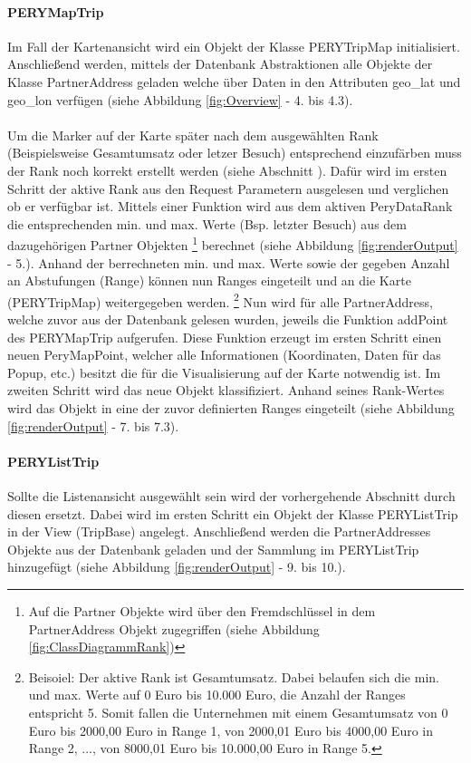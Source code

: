 \documentclass[Bachelorarbeit.tex]{subfiles}
\begin{document}
\paragraph{PERYMapTrip}
\label{PERYMapTrip}
Im Fall der Kartenansicht wird ein Objekt der Klasse PERYTripMap initialisiert. 
Anschließend werden, mittels der Datenbank Abstraktionen alle Objekte der Klasse PartnerAddress geladen welche über Daten in den Attributen geo\_lat und geo\_lon verfügen (siehe Abbildung \ref{fig:Overview} - 4. bis 4.3). \\
\\
Um die Marker auf der Karte später nach dem ausgewählten Rank (Beispielsweise Gesamtumsatz oder letzer Besuch) entsprechend einzufärben muss der Rank noch korrekt erstellt werden (siehe Abschnitt ). 
Dafür wird im ersten Schritt der aktive Rank aus den Request Parametern ausgelesen und verglichen ob er verfügbar ist.
Mittels einer Funktion wird aus dem aktiven PeryDataRank die entsprechenden min. und max. Werte (Bsp. letzter Besuch) aus dem dazugehörigen Partner Objekten
	\footnote{Auf die Partner Objekte wird über den Fremdschlüssel in dem PartnerAddress Objekt zugegriffen (siehe Abbildung \ref{fig:ClassDiagrammRank})}  
berechnet (siehe Abbildung \ref{fig:renderOutput} - 5.).
Anhand der berrechneten min. und max. Werte sowie der gegeben Anzahl an Abstufungen (Range) können nun Ranges eingeteilt und an die Karte (PERYTripMap) weitergegeben werden.
	\footnote{Beisoiel: Der aktive Rank ist Gesamtumsatz. Dabei belaufen sich die min. und max. Werte auf 0 Euro bis 10.000 Euro, die Anzahl der Ranges entspricht 5. Somit fallen die Unternehmen mit einem Gesamtumsatz von 0 Euro bis 2000,00 Euro in Range 1, von 2000,01 Euro bis 4000,00 Euro in Range 2, ..., von 8000,01 Euro bis 10.000,00 Euro in Range 5.} 
Nun wird für alle PartnerAddress, welche zuvor aus der Datenbank gelesen wurden, jeweils die Funktion addPoint des PERYMapTrip  aufgerufen. 
Diese Funktion erzeugt im ersten Schritt einen neuen PeryMapPoint, welcher alle Informationen (Koordinaten, Daten für das Popup, etc.) besitzt die für die Visualisierung auf der Karte notwendig ist.
Im zweiten Schritt wird das neue Objekt klassifiziert.  
Anhand seines Rank-Wertes wird das Objekt in eine der zuvor definierten Ranges eingeteilt (siehe Abbildung \ref{fig:renderOutput} - 7. bis 7.3).

\paragraph{PERYListTrip}
\label{PERYListTrip}
Sollte die Listenansicht ausgewählt sein wird der vorhergehende Abschnitt durch diesen ersetzt.
Dabei wird im ersten Schritt ein Objekt der Klasse PERYListTrip in der View (TripBase) angelegt.
Anschließend werden die PartnerAddresses Objekte aus der Datenbank geladen und der Sammlung im PERYListTrip hinzugefügt (siehe Abbildung \ref{fig:renderOutput} - 9. bis 10.).
\end{document}
